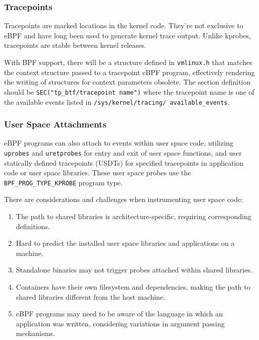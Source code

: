 \subsubsection{Tracepoints}

Tracepoints are marked locations in the kernel code. They're not exclusive to eBPF and have long been used to generate kernel trace output. Unlike kprobes, tracepoints are stable between kernel releases.

With BPF support, there will be a structure defined in \texttt{vmlinux.h} that matches the context structure passed to a tracepoint eBPF program, effectively rendering the writing of structures for context parameters obsolete. The section definition should be \texttt{SEC("tp\_btf/tracepoint name")} where the tracepoint name is one of the available events listed in \texttt{/sys/kernel/tracing/ available\_events}.


\subsubsection{User Space Attachments}


eBPF programs can also attach to events within user space code, utilizing \texttt{uprobes} and \texttt{uretprobes} for entry and exit of user space functions, and user statically defined tracepoints (USDTs) for specified tracepoints in application code or user space libraries. These user space probes use the \texttt{BPF\_PROG\_TYPE\_KPROBE} program type.

There are considerations and challenges when instrumenting user space code:

\begin{enumerate}
    \item The path to shared libraries is architecture-specific, requiring corresponding definitions. 
    \item Hard to predict the installed user space libraries and applications on a machine. 
    \item Standalone binaries may not trigger probes attached within shared libraries. 
    \item Containers have their own filesystem and dependencies, making the path to shared libraries different from the host machine. 
    \item eBPF programs may need to be aware of the language in which an application was written, considering variations in argument passing mechanisms. 
\end{enumerate}

